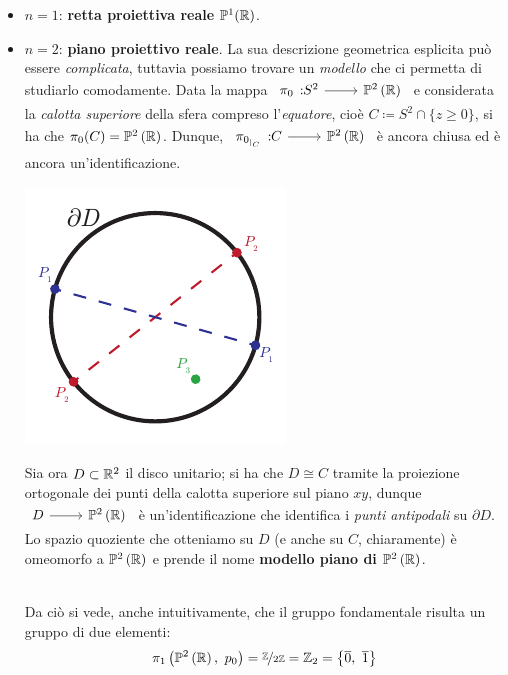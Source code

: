 	\begin{itemize}
		\item \underline{$n=1$}: \textbf{retta proiettiva reale} $\mathbb{P}^1(\mathbb{R})$.
		\item \underline{$n=2$}: \textbf{piano proiettivo reale}. La sua descrizione geometrica esplicita può essere \textit{complicata}, tuttavia possiamo trovare un \textit{modello} che ci permetta di studiarlo comodamente. Data la mappa $\funz {\pi_0	} {S^2} {\proj[2]{\realset}}$ e considerata la \textit{calotta superiore} della sfera compreso l'\textit{equatore}, cioè $C\coloneqq S^2\cap\{z\geq 0\}$, si ha che $\pi_0(C)=\proj[2]{\realset}$. Dunque, $\funz {\pi_{0_{\mid_{C}}}} C {\proj[2]{\realset}}$ è ancora chiusa ed è ancora un'identificazione.\\
\begin{minipage}{.23\linewidth}
	\includegraphics[trim=0cm 0cm 0cm 0cm,clip,scale=0.75]{images/projdisc.pdf}
\end{minipage}
\begin{minipage}{.76\linewidth}
	Sia ora $D\subset\mathbb{R}^2$ il disco unitario; si ha che $D\cong C$ tramite la proiezione ortogonale dei punti della calotta superiore sul piano $xy$, dunque $\funz{\ }{D}{\proj[2]{\realset}}$ è un'identificazione che identifica i \textit{punti antipodali} su $\partial{D}$. Lo spazio quoziente che otteniamo su $D$ (e anche su $C$, chiaramente) è omeomorfo a $\proj[2]{\realset}$ e prende il nome \textbf{modello piano di $\proj[2]{\realset}$}.
\end{minipage}\\
		Da ciò si vede, anche intuitivamente, che il gruppo fondamentale risulta un gruppo di due elementi:
		\begin{equation}
			\gruf{\proj[2]{\realset}}{p_0}=\nicefrac{\integerset}{2\integerset}=\integerset_2=\left\{\overline{0},\ \overline{1}\right\}
		\end{equation}

\end{itemize}
